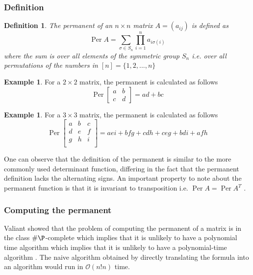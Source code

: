 \documentclass[11pt]{article}
\theoremstyle{theorem}
\theoremstyle{remark}
\theoremstyle{plain}
\newtheorem{definition}[theorem]{Definition}%
\theoremstyle{definition}
\newtheorem{example}[theorem]{Example}
\DeclareMathOperator*{\Per}{\mathrm{Per}}
\begin{document}
\subsubsection{Definition}
\begin{definition}{\cite{marcus_minc66}}
The permanent of an $n \times n$ matrix $A = (a_{ij})$ is defined as
\begin{equation}
\Per A = \sum_{\sigma \in S_n} \prod_{i=1}^n a_{i\sigma(i)}
\end{equation}
where the sum is over all elements of the symmetric group $S_n$ i.e. over all permutations of the numbers in $[n] = \{1, 2, ... , n\}$
\end{definition}

\begin{example}
For a $2 \times 2$ matrix, the permanent is calculated as follows
\begin{equation}
\Per 
\begin{bmatrix}
a & b \\
c & d
\end{bmatrix}
= ad + bc
\end{equation}
\end{example}
\begin{example}
For a $3 \times 3$ matrix, the permanent is calculated as follows
\begin{equation}
\Per 
\begin{bmatrix}
a & b & c\\
d & e & f\\
g & h & i\\ 
\end{bmatrix}
= aei +bfg + cdh + ceg + bdi + afh
\end{equation}
\end{example}
One can observe that the definition of the permanent is similar to the more commonly used determinant function, differing in the fact that the permanent definition lacks the alternating signs. An important property to note about the permanent function is that it is invariant to transposition i.e. $\Per A = \Per A^T$ \cite{ryser_1963}.

\subsubsection{Computing the permanent}\label{prelim_permanent_calc}
Valiant showed that the problem of computing the permanent of a matrix is in the class $\# \P$-complete which implies that it is unlikely to have a polynomial time algorithm which implies that it is unlikely to have a polynomial-time algorithm \cite{valiant1979}. The naive algorithm obtained by directly translating the formula into an algorithm would run in $\mathcal{O}(n!n)$ time.
\end{document}

